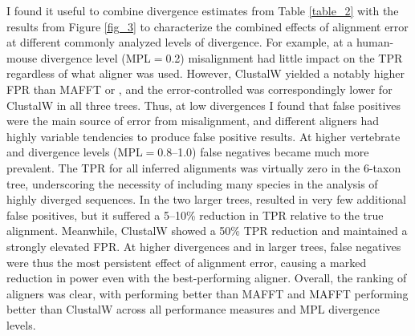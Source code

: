 I found it useful to combine divergence estimates from Table
\ref{table_2} with the results from Figure \ref{fig_3} to characterize
the combined effects of alignment error at different commonly analyzed
levels of divergence. For example, at a human-mouse divergence level
(MPL$=$0.2) misalignment had little impact on the TPR regardless of
what aligner was used. However, ClustalW yielded a notably higher FPR
than MAFFT or \prankc, and the error-controlled \tpr{} was
correspondingly lower for ClustalW in all three trees. Thus, at low
divergences I found that false positives were the main source of
error from misalignment, and different aligners had highly variable
tendencies to produce false positive results. At higher vertebrate and
\Dr divergence levels (MPL$=$0.8--1.0) false negatives became much
more prevalent. The TPR for all inferred alignments was virtually zero
in the 6-taxon tree, underscoring the necessity of including many
species in the analysis of highly diverged sequences. In the two
larger trees, \prankc resulted in very few additional false positives,
but it suffered a 5--10\% reduction in TPR relative to the true
alignment. Meanwhile, ClustalW showed a 50\% TPR reduction and
maintained a strongly elevated FPR. At higher divergences and in
larger trees, false negatives were thus the most persistent effect of
alignment error, causing a marked reduction in \sw power even with the
best-performing aligner. Overall, the ranking of aligners was clear,
with \prankc performing better than MAFFT and MAFFT performing better
than ClustalW across all performance measures and MPL divergence
levels.

